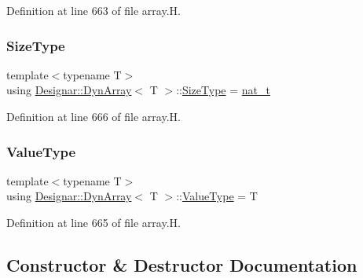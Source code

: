 Definition at line 663 of file array.\+H.

\mbox{\label{class_designar_1_1_dyn_array_a830e5247348d7d54c65d25f77ecc74bb}} 
\subsubsection{\texorpdfstring{Size\+Type}{SizeType}}
{\footnotesize\ttfamily template$<$typename T$>$ \\
using \hyperlink{class_designar_1_1_dyn_array}{Designar\+::\+Dyn\+Array}$<$ T $>$\+::\hyperlink{class_designar_1_1_fixed_array_a503ae414cc313d248e77c08e62ef043c}{Size\+Type} =  \hyperlink{namespace_designar_aa72662848b9f4815e7bf31a7cf3e33d1}{nat\+\_\+t}}



Definition at line 666 of file array.\+H.

\mbox{\label{class_designar_1_1_dyn_array_a1df36ad5f778935dcd565138afc155a4}} 
\subsubsection{\texorpdfstring{Value\+Type}{ValueType}}
{\footnotesize\ttfamily template$<$typename T$>$ \\
using \hyperlink{class_designar_1_1_dyn_array}{Designar\+::\+Dyn\+Array}$<$ T $>$\+::\hyperlink{class_designar_1_1_fixed_array_ac1cfeb4403a2dcbffd7ef494e5b873d0}{Value\+Type} =  T}



Definition at line 665 of file array.\+H.



\subsection{Constructor \& Destructor Documentation}
\mbox{\label{class_designar_1_1_dyn_array_a9a00e1336657f98b96e7c38fc7da332c}} 
